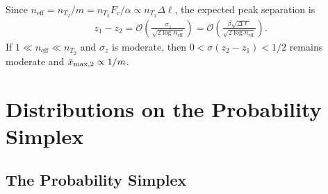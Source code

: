 Since $n_{\mathrm{eff}} = n_{T_2} / m = n_{T_2} F_c / \alpha \propto n_{T_2} \Delta\ell$, the expected peak separation is
\begin{align}
    z_1 - z_2
    = \mathcal{O}\left(\frac{\sigma_z}{\sqrt{2 \log n_{\mathrm{eff}}}}\right)
    = \mathcal{O}\left(\frac{\beta \sqrt{\Delta\ell}}{\sqrt{2 \log n_{\mathrm{eff}}}}\right).
\end{align}
If $1 \ll n_{\mathrm{eff}} \ll n_{T_2}$ and $\sigma_z$ is moderate, then $0 < \sigma(z_2 - z_1) < 1 / 2$ remains moderate and $\bar{x}_{\max,2} \propto 1 / m$.

\section{Distributions on the Probability Simplex}\label{sec:apx:prob_simplex_distbns}

\subsection{The Probability Simplex}\label{sec:apx:prob_simplex}


